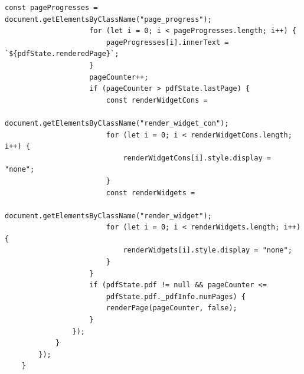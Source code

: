\begin{lstlisting}[style=ES6, caption={Renderfunktion}, label=code:render, breaklines=true]
					const pageProgresses = document.getElementsByClassName("page_progress");
					for (let i = 0; i < pageProgresses.length; i++) {
						pageProgresses[i].innerText = `${pdfState.renderedPage}`;
					}
					pageCounter++;
					if (pageCounter > pdfState.lastPage) {
						const renderWidgetCons = 
							document.getElementsByClassName("render_widget_con");
						for (let i = 0; i < renderWidgetCons.length; i++) {
							renderWidgetCons[i].style.display = "none";
						}
						const renderWidgets = 
							document.getElementsByClassName("render_widget");
						for (let i = 0; i < renderWidgets.length; i++) {
							renderWidgets[i].style.display = "none";
						}
					} 
					if (pdfState.pdf != null && pageCounter <= 
						pdfState.pdf._pdfInfo.numPages) {
						renderPage(pageCounter, false);
					}
				});
			}
		});
	}
\end{lstlisting} 

